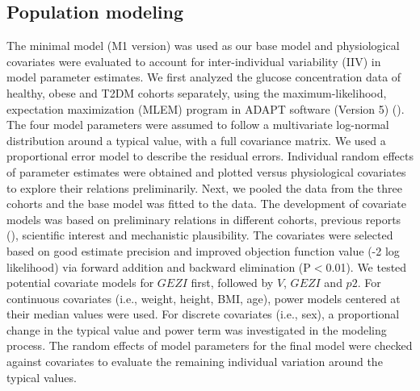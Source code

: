 \documentclass[utf8]{frontiersSCNS} %
\begin{document}
\subsection{Population modeling}
The minimal model (M1 version) was used as our base model and physiological covariates were evaluated to account for inter-individual variability (IIV) in model parameter estimates. We first analyzed the glucose concentration data of healthy, obese and T2DM cohorts separately, using the maximum-likelihood, expectation maximization (MLEM) program in ADAPT software (Version 5) (\cite{DArgenioDavidZ.SchumitzkyAlan2009}). The four model parameters were assumed to follow a multivariate log-normal distribution around a typical value, with a full covariance matrix. We used a proportional error model to describe the residual errors. Individual random effects of parameter estimates were obtained and plotted versus physiological covariates to explore their relations preliminarily. 
Next, we pooled the data from the three cohorts and the base model was fitted to the data. The development of covariate models was based on preliminary relations in different cohorts, previous reports (\cite{Denti2010}), %
scientific interest and mechanistic plausibility. The covariates were selected based on good estimate precision and improved objection function value (-2 log likelihood) via forward addition and backward elimination (P$<$0.01). We tested potential covariate models for $GEZI$ first, followed by $V$, $GEZI$ and $p2$. For continuous covariates (i.e., weight, height, BMI, age), power models centered at their median values were used. For discrete covariates (i.e., sex), a proportional change in the typical value and power term was investigated in the modeling process. The random effects of model parameters for the final model were checked against covariates to evaluate the remaining individual variation around the typical values.
\end{document}
